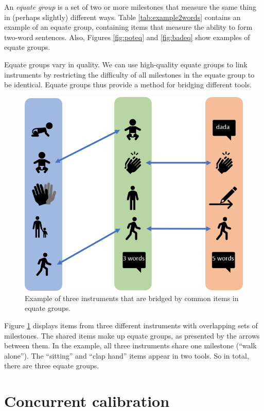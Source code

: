\documentclass[
]{book}
\begin{document}
An \emph{equate group} is a set of two or more milestones that measure the same thing in (perhaps slightly) different ways. Table \ref{tab:example2words} contains an example of an equate group, containing items that measure the ability to form two-word sentences. Also, Figures \ref{fig:poteq} and \ref{fig:badeq} show examples of equate groups.

Equate groups vary in quality. We can use high-quality equate groups to link instruments by restricting the difficulty of all milestones in the equate group to be identical. Equate groups thus provide a method for bridging different tools.

\begin{figure}

{\centering \includegraphics[width=0.75\linewidth]{fig/equate_ex} 

}

\caption{Example of three instruments that are bridged by common items in equate groups.}\label{fig:equateex}
\end{figure}



Figure \ref{fig:equateex} displays items from three different instruments with overlapping sets of milestones. The shared items make up equate groups, as presented by the arrows between them. In the example, all three instruments share one milestone (``walk alone''). The ``sitting'' and ``clap hand'' items appear in two tools. So in total, there are three equate groups.

\hypertarget{sec:concurrent}{%
\section{Concurrent calibration}\label{sec:concurrent}}
\end{document}
